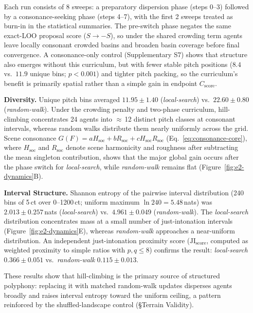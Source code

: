 \documentclass[letterpaper]{article}
\begin{document}
Each run consists of 8 sweeps: a preparatory dispersion phase (steps 0--3) followed by a consonance-seeking phase (steps 4--7), with the first 2 sweeps treated as burn-in in the statistical summaries. The pre-switch phase negates the same exact-LOO proposal score ($S \to -S$), so under the shared crowding term agents leave locally consonant crowded basins and broaden basin coverage before final convergence. A consonance-only control (Supplementary S7) shows that structure also emerges without this curriculum, but with fewer stable pitch positions ($8.4$ vs.\ $11.9$ unique bins; $p < 0.001$) and tighter pitch packing, so the curriculum's benefit is primarily spatial rather than a simple gain in endpoint $C_{\text{score}}$.

\textbf{Diversity.} Unique pitch bins averaged $11.95 \pm 1.40$ (\emph{local-search}) vs.\ $22.60 \pm 0.80$ (\emph{random-walk}). Under the crowding penalty and two-phase curriculum, hill-climbing concentrates 24 agents into $\approx$\,12 distinct pitch classes at consonant intervals, whereas random walks distribute them nearly uniformly across the grid. Scene consonance $G(F)=aH_{\mathrm{soc}}+bR_{\mathrm{soc}}+cH_{\mathrm{soc}}R_{\mathrm{soc}}$ (Eq.~\ref{eq:consonance-core}), where $H_{\mathrm{soc}}$ and $R_{\mathrm{soc}}$ denote scene harmonicity and roughness after subtracting the mean singleton contribution, shows that the major global gain occurs after the phase switch for \emph{local-search}, while \emph{random-walk} remains flat (Figure~\ref{fig:e2-dynamics}B).

\textbf{Interval Structure.} Shannon entropy of the pairwise interval distribution (240 bins of 5\,ct over 0--1200\,ct; uniform maximum $\ln 240 = 5.48$\,nats) was $2.013 \pm 0.257$\,nats (\emph{local-search}) vs.\ $4.961 \pm 0.049$ (\emph{random-walk}). The \emph{local-search} distribution concentrates mass at a small number of just-intonation intervals (Figure~\ref{fig:e2-dynamics}E), whereas \emph{random-walk} approaches a near-uniform distribution. An independent just-intonation proximity score ($\mathrm{JI}_{\text{score}}$, computed as weighted proximity to simple ratios with $p,q \leq 8$) confirms the result: \emph{local-search} $0.366 \pm 0.051$ vs.\ \emph{random-walk} $0.115 \pm 0.013$.

These results show that hill-climbing is the primary source of structured polyphony: replacing it with matched random-walk updates disperses agents broadly and raises interval entropy toward the uniform ceiling, a pattern reinforced by the shuffled-landscape control (\S Terrain Validity).
\end{document}
